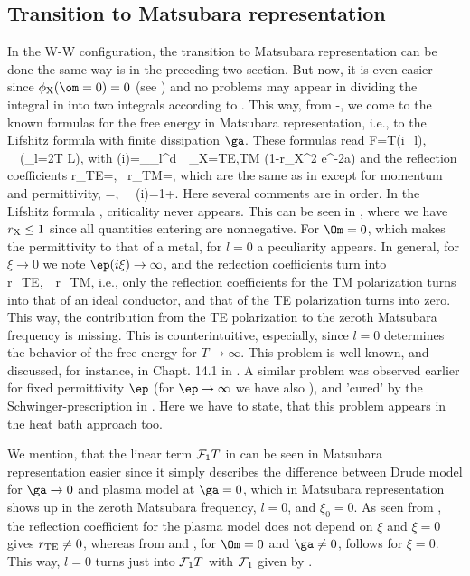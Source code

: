 \documentclass[notitlepage,prd,aps,longbibliography,twocolumn]{revtex4-1}
\begin{document}
\subsection{\label{T5.3}Transition to Matsubara representation}
%
In the W-W configuration, the transition to Matsubara representation can be done the same way is in the preceding two section. But now, it is even easier since $\phi_{\rm X}(\om=0)=0$ (see ) and no problems may appear in dividing the integral in  into two integrals according to . This way, from -, we come to the known formulas for the free energy in Matsubara representation, i.e., to the Lifshitz formula with finite dissipation $\ga$. These formulas read
%
\be F=T\sump \varphi(i\xi_l), \ \ (\xi_l=2\pi T L),
\label{5.31}\ee
%
with
%
\be \varphi(i\xi)=\int_{\xi_l}^\infty d\eta \, \eta \, \sum_{\rm X=TE,TM}
    \ln\left(1-r_{\rm X}^2 e^{-2a\eta}\right)
\label{5.32}\ee
%
and the reflection coefficients
%
\be r_{\rm TE}=\frac{\eta-\kappa}{\eta+\kappa}, \
r_{\rm TM}=,
\label{5.33}\ee
%
which are the same as in  except for  momentum and permittivity,
%
\be \kappa=, \ \ \ep(i\xi)=1+.
\label{5.34}\ee
%
Here several comments are in order. In the Lifshitz formula , criticality never appears. This can be seen in , where we have $r_{\rm X}\le1$ since all quantities entering  are nonnegative.
For $\Om=0$, which makes the permittivity \Ref{5.34} to that of a metal,  for $l=0$ a peculiarity appears. In general, for $\xi\to0$ we note $\ep(i\xi)\to\infty$, and the reflection coefficients turn into
%
\be r_{\rm TE},\ \ r_{\rm TM},
\label{5.35}\ee
%
i.e., only the reflection coefficients for the TM polarization turns into that of an ideal conductor, and that of the TE polarization turns into zero. This way, the contribution from the TE polarization to the zeroth Matsubara frequency is missing. This is counterintuitive, especially, since $l=0$ determines the behavior of the free energy for $T\to\infty$. This problem is well known, and discussed, for instance, in Chapt. 14.1 in \cite{BKMM}. A similar problem was observed earlier for fixed permittivity $\ep$ (for $\ep\to\infty$ we have also ), and 'cured' by the Schwinger-prescription in \cite{schw78-115-1}.
Here we have to state, that this problem appears in the heat bath approach too.

We mention, that the linear term ${\cal F}_1T$ in  can be seen in Matsubara representation easier since it simply describes the difference between Drude model for $\ga\to0$ and plasma model at $\ga=0$,
%
which in Matsubara representation shows up in the zeroth Matsubara frequency, $l=0$, and $\xi_0=0$.
%
As seen from , the reflection coefficient for the plasma model does not depend on $\xi$ and $\xi=0$ gives $r_{\rm TE}\ne0$, whereas from  and , for $\Om=0$ and $\ga\ne0$,  follows for $\xi=0$. This way, $l=0$
%
turns  just into ${\cal F}_1T$ with ${\cal F}_1$ given by .
\end{document}
